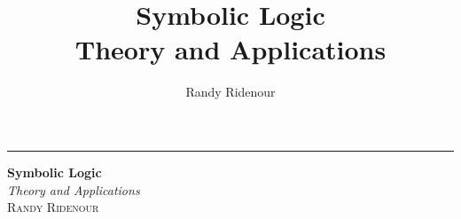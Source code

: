 \documentclass[letterpaper,12pt,oneside,onecolumn]{memoir}
\title{Symbolic Logic\\Theory and Applications}
\author{Randy Ridenour}
\begin{document}
\frontmatter

\begin{titlingpage}
  \thispagestyle{empty}
  
  \rule{1pt}{\textheight} %
  \hspace{0.05\textwidth} %
  \parbox[b]{0.75\textwidth}{ %
    
    {\Huge\bfseries Symbolic Logic}\\[2\baselineskip] %
    
    {\large\textit{Theory and Applications}}\\[4\baselineskip] %
    {\Large\textsc{Randy Ridenour}} %
    
    \vspace{0.5\textheight} %
  }
\end{titlingpage}



\tableofcontents*

\mainmatter









\printbibliography
\end{document}
